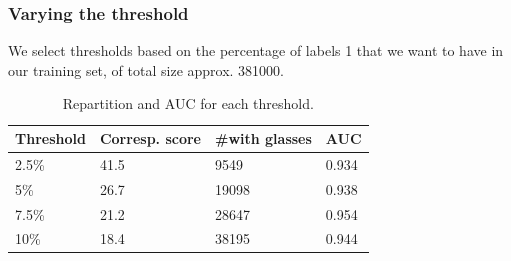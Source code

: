 \documentclass[a4paper]{article}
\begin{document}
        \subsubsection{Varying the threshold\label{vary:th}}
            We select thresholds based on the percentage of labels 1 that we want to have in our training set, of total size approx. 381000.
            \begin{table}[H]
            \centering
            \label{table_th}
            \begin{tabular}{|l|l|l|l|}
            \hline
            Threshold & Corresp. score & \#with glasses & AUC   \\ \hline
            2.5\%    & 41.5  & 9549           & 0.934 \\ \hline
            5\%      & 26.7  & 19098          & 0.938 \\ \hline
            7.5\%    & 21.2  & 28647          & 0.954 \\ \hline
            10\%     & 18.4  & 38195          & 0.944 \\ \hline
            \end{tabular}
            \caption{Repartition and AUC for each threshold. }
            \end{table}
            
\end{document}
